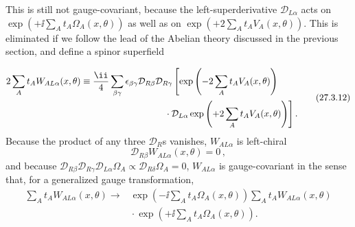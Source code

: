 \begin{sloppypar}
This is still not gauge-covariant, because the left-superderivative
\(\mathcal{D}_{L\alpha}\) acts on
\(\exp(+\ii\sum_A t_A\Omega_A(x,\theta))\) as well as on
\(\exp(+2\sum_A t_A V_A(x,\theta))\). This is eliminated if we follow
the lead of the Abelian theory discussed in the previous section, and
define a spinor superfield
\end{sloppypar}
\begin{equation}
  \begin{aligned}
  2\sum_A t_AW_{AL\alpha}(x,\theta)
  \equiv{}&
  \frac{\ii}{4}\sum_{\beta\gamma}\epsilon_{\beta\gamma}
  \mathcal{D}_{R\beta}\mathcal{D}_{R\gamma}
  \left[
    \exp\left(-2\sum_A t_AV_A(x,\theta)\right)
  \right.
  \\
  &\left.\hspace{27mm}{}
    \cdot\mathcal{D}_{L\alpha}
    \exp\left(+2\sum_A t_AV_A(x,\theta)\right)
  \right].
  \end{aligned}
  \tag{27.3.12}\label{eq:27.3.12}
\end{equation}
Because the product of any three \(\mathcal{D}_R\)s vanishes,
\(W_{AL\alpha}\) is left-chiral
\begin{equation}
  \mathcal{D}_{R\beta}W_{AL\alpha}(x,\theta)=0\,,
  \tag{27.3.13}\label{eq:27.3.13}
\end{equation}
and because
\(\mathcal{D}_{R\beta}\mathcal{D}_{R\gamma}
\mathcal{D}_{L\alpha}\Omega_A
\propto\mathcal{D}_{R\delta}\Omega_A=0\),
\(W_{AL\alpha}\) is gauge-covariant in the sense that, for a generalized
gauge transformation,
\begin{equation}
  \begin{aligned}
  \sum_A t_AW_{AL\alpha}(x,\theta)
  \longrightarrow{}&
  \exp\left(-\ii\sum_A t_A\Omega_A(x,\theta)\right)
  \sum_A t_AW_{AL\alpha}(x,\theta)
  \\
  &{}\cdot
  \exp\left(+\ii\sum_A t_A\Omega_A(x,\theta)\right).
  \end{aligned}
  \tag{27.3.14}\label{eq:27.3.14}
\end{equation}

